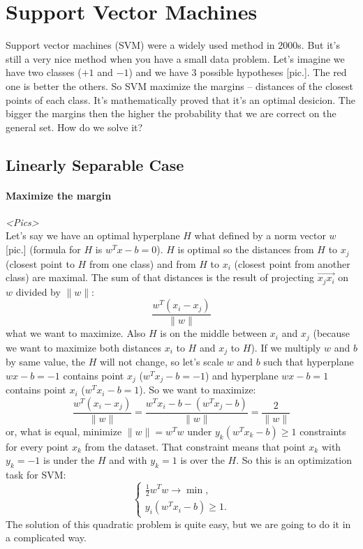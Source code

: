 \chapter{Support Vector Machines}

{\sf Support vector machines (SVM) were a widely used method in 2000s. But it's still a very nice method when you have a small data problem. Let's imagine we have two classes ($+1$ and $-1$) and we have 3 possible hypotheses [pic.]. The red one is better the others. So SVM maximize the margins -- distances of the closest points of each class. It's mathematically proved that it's an optimal desicion. The bigger the margins then the higher the probability that we are correct on the general set. How do we solve it?}

\section{Linearly Separable Case}
\vspace{-0.6cm}
\subsubsection*{Maximize the margin}

{\it <Pics>}\\
Let's say we have an optimal hyperplane $H$ what defined by a norm vector $w$ [pic.] (formula for $H$ is $w^Tx-b=0$). $H$ is optimal so the distances from $H$ to $x_j$ (closest point to $H$ from one class) and from $H$ to $x_i$ (closest point from another class) are maximal. The sum of that distances is the result of projecting $\overrightarrow{x_jx_i}$ on $w$ divided by $\|w\|$:
$$\frac{w^T(x_i-x_j)}{\|w\|}$$
what we want to maximize. Also $H$ is on the middle between $x_i$ and $x_j$ (because we want to maximize both distances $x_i$ to $H$ and $x_j$ to $H$). If we multiply $w$ and $b$ by same value, the $H$ will not change, so let's scale $w$ and $b$ such that hyperplane $wx-b=-1$ contains point $x_j$ ($w^Tx_j-b=-1$) and hyperplane $wx-b=1$ contains point $x_i$ ($w^Tx_i-b=1$). So we want to maximize:
$$\frac{w^T(x_i-x_j)}{\|w\|}=\frac{w^Tx_i-b-(w^Tx_j-b)}{\|w\|}=\frac{2}{\|w\|}$$
or, what is equal, minimize $\|w\|=w^Tw$ under $y_k(w^Tx_k-b)\ge 1$ constraints for every point $x_k$ from the dataset. That constraint means that point $x_k$ with $y_k=-1$ is under the $H$ and with $y_k=1$ is over the $H$. So this is an optimization task for SVM:
$$\begin{cases}
	\frac{1}{2}w^Tw\to\min, \\
	y_i(w^Tx_i-b)\ge1.
\end{cases}$$
The solution of this quadratic problem is quite easy, but we are going to do it in a complicated way.

